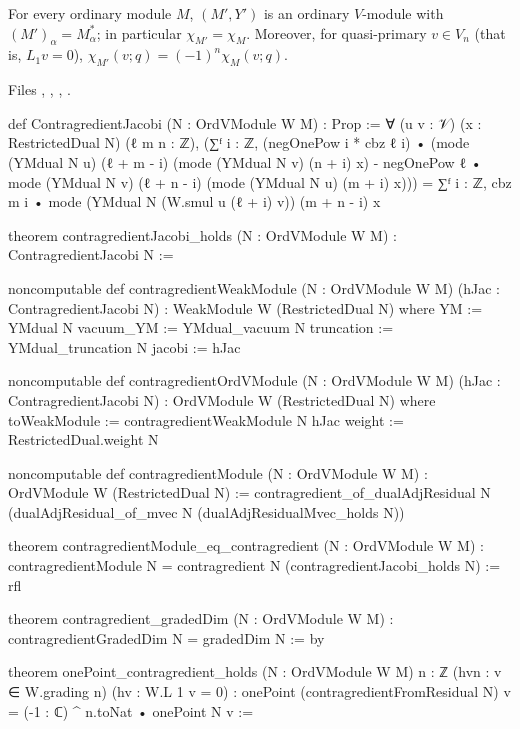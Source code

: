 \begin{theorem}\label{l12:thm:contra}
For every ordinary module $M$, $(M',Y')$ is an ordinary $V$-module with $(M')_\alpha = M_\alpha^*$; in particular
$\chi_{M'} = \chi_M$. Moreover, for quasi-primary $v\in V_n$ (that is, $L_1v = 0$),
$\chi_{M'}(v;q) = (-1)^n\chi_M(v;q)$.
\end{theorem}
\noindent Files ,
,
,
.
\begin{leancode}
def ContragredientJacobi (N : OrdVModule W M) : Prop :=
  ∀ (u v : 𝒱) (x : RestrictedDual N) (ℓ m n : ℤ),
    (∑ᶠ i : ℤ, (negOnePow i * cbz ℓ i) •
        (mode (YMdual N u) (ℓ + m - i) (mode (YMdual N v) (n + i) x)
          - negOnePow ℓ • mode (YMdual N v) (ℓ + n - i) (mode (YMdual N u) (m + i) x)))
      = ∑ᶠ i : ℤ, cbz m i • mode (YMdual N (W.smul u (ℓ + i) v)) (m + n - i) x

theorem contragredientJacobi_holds (N : OrdVModule W M) : ContragredientJacobi N :=

noncomputable def contragredientWeakModule (N : OrdVModule W M)
    (hJac : ContragredientJacobi N) : WeakModule W (RestrictedDual N) where
  YM := YMdual N
  vacuum_YM := YMdual_vacuum N
  truncation := YMdual_truncation N
  jacobi := hJac

noncomputable def contragredientOrdVModule (N : OrdVModule W M) (hJac : ContragredientJacobi N) :
    OrdVModule W (RestrictedDual N) where
  toWeakModule := contragredientWeakModule N hJac
  weight := RestrictedDual.weight N

noncomputable def contragredientModule (N : OrdVModule W M) : OrdVModule W (RestrictedDual N) :=
  contragredient_of_dualAdjResidual N (dualAdjResidual_of_mvec N (dualAdjResidualMvec_holds N))

theorem contragredientModule_eq_contragredient (N : OrdVModule W M) :
    contragredientModule N = contragredient N (contragredientJacobi_holds N) := rfl

theorem contragredient_gradedDim (N : OrdVModule W M) :
    contragredientGradedDim N = gradedDim N := by

theorem onePoint_contragredient_holds (N : OrdVModule W M) {n : ℤ}
    (hvn : v ∈ W.grading n) (hv : W.L 1 v = 0) :
    onePoint (contragredientFromResidual N) v = (-1 : ℂ) ^ n.toNat • onePoint N v :=
\end{leancode}

